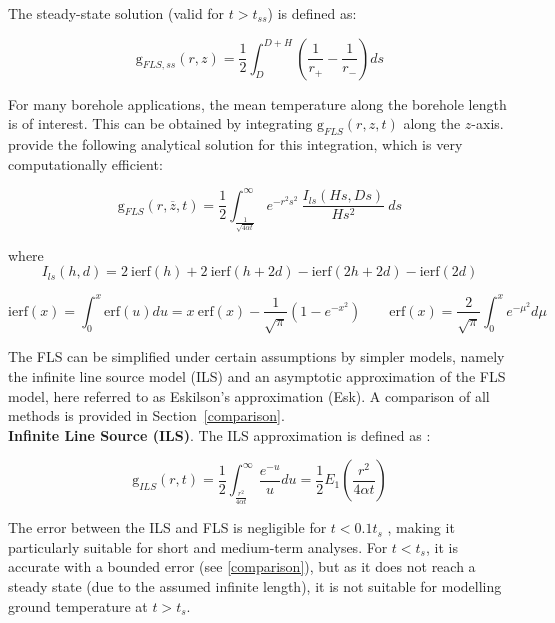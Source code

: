 The steady-state solution (valid for $t > t_{ss}$) is defined as:

\begin{equation}
\label{eq:FLS_ss}
    \mathrm{g}_{FLS,ss}(r, z) = \frac{1}{2} \int_{D}^{D+H} \left( \frac{1}{r_+} - \frac{1}{r_-} \right) ds
\end{equation}

For many borehole applications, the mean temperature along the borehole length is of interest. This can be obtained by integrating $\mathrm{g}_{FLS}(r, z, t) $ along the $z$-axis. \citet{claesson_analytical_2011} provide the following analytical solution for this integration, which is very computationally efficient: 

\begin{equation}
\label{eq:FLS_int}
    \mathrm{g}_{FLS}(r, \overline{z}, t) = \frac{1}{2} \int_{\frac{1}{\sqrt{4 \alpha t}}}^{\infty}  e^{- r^2 s^2} \ \frac{I_{ls}(Hs, Ds)}{H s^2} \ ds
\end{equation}

where
\begin{equation*}
    I_{ls}(h, d) = 2\ \mathrm{ierf}(h) + 2\ \mathrm{ierf}(h + 2d) - \mathrm{ierf}(2h + 2d) - \mathrm{ierf}(2d)
\end{equation*}

\begin{equation*}
    \mathrm{ierf}(x) = \int_0^x \mathrm{erf}(u) du 
                     = x \ \mathrm{erf}(x) - \frac{1}{\sqrt{\pi}} (1 - e^{-x^2})
    \qquad
    \mathrm{erf}(x) = \frac{2}{\sqrt{\pi}} \int_0^x e^{-\mu^2} d \mu 
\end{equation*}

The FLS can be simplified under certain assumptions by simpler models, namely the infinite line source model (ILS) and an asymptotic approximation of the FLS model, here referred to as Eskilson's approximation (Esk). A comparison of all methods is provided in Section~\ref{comparison}.
\\

\textbf{Infinite Line Source (ILS)}. The ILS approximation is defined as \citep{poppel_grenzabstande_2017}:

\begin{equation}
\label{eq:ILS}
    \mathrm{g}_{ILS}(r, t) = \frac{1}{2} \int_\frac{r^2}{4 \alpha t}^\infty \frac{e^{-u}}{u}du 
                  = \frac{1}{2} E_1\left(\frac{r^2}{4 \alpha t}\right)
\end{equation}

The error between the ILS and FLS is negligible for $t < 0.1 t_s$ \citep{claesson_conductive_1988}, making it particularly suitable for short and medium-term analyses. For $t<t_s$, it is accurate with a bounded error (see \ref{comparison}), but as it does not reach a steady state (due to the assumed infinite length), it is not suitable for modelling ground temperature at $t>t_s$.
\\

